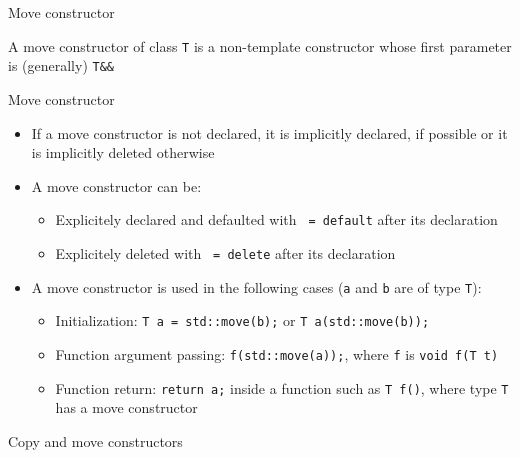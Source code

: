 \begin{frame}{Move constructor}{}
  \begin{definition}
    A move constructor of class \lstinline!T! is a non-template constructor whose first parameter is (generally) \lstinline!T&&!
  \end{definition}

  \begin{block}{Move constructor}
    \begin{itemize}
    \item
      If a move constructor is not declared, it is implicitly declared, if possible or it is implicitly deleted otherwise
    \item
      A move constructor can be:
      \begin{itemize}
      \item
        Explicitely declared and defaulted with \lstinline! = default! after its declaration
      \item
        Explicitely deleted with \lstinline! = delete! after its declaration
      \end{itemize}
    \item
      A move constructor is used in the following cases (\lstinline!a! and \lstinline!b! are of type \lstinline!T!):
      \begin{itemize}
      \item
        Initialization: \lstinline!T a = std::move(b);! or \lstinline!T a(std::move(b));!
      \item
        Function argument passing: \lstinline!f(std::move(a));!, where \lstinline!f! is \lstinline!void f(T t)!
      \item
        Function return: \lstinline!return a;! inside a function such as \lstinline!T f()!, where type \lstinline!T! has a move constructor
      \end{itemize}
    \end{itemize}
  \end{block}
\end{frame}

\begin{frame}{Copy and move constructors}{}
  \begin{example}
  \end{example}
\end{frame}



